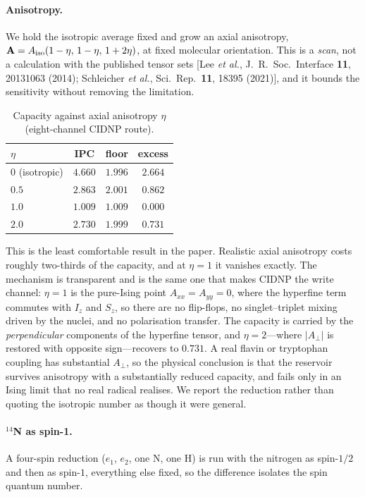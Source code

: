 \documentclass[aps,prx,reprint,superscriptaddress,nofootinbib,floatfix]{revtex4-2}
\begin{document}
\paragraph*{Anisotropy.} We hold the isotropic average fixed and grow an axial
anisotropy, $\mathbf{A}=A_{\rm iso}(1-\eta,\,1-\eta,\,1+2\eta)$, at fixed
molecular orientation. This is a \emph{scan}, not a calculation with the published
tensor sets [Lee \textit{et al.}, J.~R.~Soc.~Interface \textbf{11}, 20131063
(2014); Schleicher \textit{et al.}, Sci.~Rep.\ \textbf{11}, 18395 (2021)], and it
bounds the sensitivity without removing the limitation.

\begin{table}[H]
\caption{\label{tab:aniso}Capacity against axial anisotropy $\eta$
(eight-channel CIDNP route).}
\begin{ruledtabular}
\begin{tabular}{lccc}
$\eta$ & IPC & floor & excess \\
\hline
$0$ (isotropic) & $4.660$ & $1.996$ & $\mathbf{2.664}$ \\
$0.5$ & $2.863$ & $2.001$ & $0.862$ \\
$1.0$ & $1.009$ & $1.009$ & $0.000$ \\
$2.0$ & $2.730$ & $1.999$ & $0.731$ \\
\end{tabular}
\end{ruledtabular}
\end{table}

This is the least comfortable result in the paper. Realistic axial anisotropy
costs roughly two-thirds of the capacity, and at $\eta=1$ it vanishes exactly.
The mechanism is transparent and is the same one that makes CIDNP the write
channel: $\eta=1$ is the pure-Ising point $A_{xx}=A_{yy}=0$, where the hyperfine
term commutes with $I_z$ and $S_z$, so there are no flip-flops, no
singlet--triplet mixing driven by the nuclei, and no polarisation transfer. The
capacity is carried by the \emph{perpendicular} components of the hyperfine
tensor, and $\eta=2$---where $|A_\perp|$ is restored with opposite sign---recovers
to $0.731$. A real flavin or tryptophan coupling has substantial $A_\perp$, so
the physical conclusion is that the reservoir survives anisotropy with a
substantially reduced capacity, and fails only in an Ising limit that no real
radical realises. We report the reduction rather than quoting the isotropic
number as though it were general.

\paragraph*{$^{14}$N as spin-1.} A four-spin reduction ($e_1$, $e_2$, one N, one
H) is run with the nitrogen as spin-$1/2$ and then as spin-$1$, everything else
fixed, so the difference isolates the spin quantum number.
\end{document}
